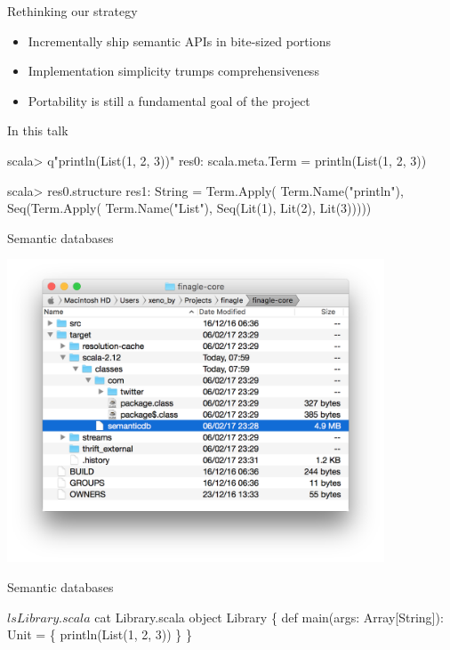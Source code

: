 \documentclass[svgnames,dvipsnames,hyperref={bookmarks=false},usepdftitle=false]{beamer}
\begin{document}
\begin{frame}{Rethinking our strategy}
\begin{itemize}
\item Incrementally ship semantic APIs in bite-sized portions
\item Implementation simplicity trumps comprehensiveness
\item Portability is still a fundamental goal of the project
\end{itemize}
\end{frame}

\begin{frame}[fragile]{In this talk}
\begin{semiverbatim}
scala> q"println(List(1, 2, 3))"
res0: scala.meta.Term = println(List(1, 2, 3))

scala> res0.structure
res1: String = Term.Apply(
  \alert{Term.Name("println")},
  Seq(Term.Apply(
    \alert{Term.Name("List")},
    Seq(Lit(1), Lit(2), Lit(3)))))
\end{semiverbatim}
\end{frame}


\begin{frame}{Semantic databases}
\begin{center}
\includegraphics[height=9cm]{semantic-db.png}
\end{center}
\end{frame}

\begin{frame}[fragile]{Semantic databases}
\begin{semiverbatim}
$ ls
Library.scala

$ cat Library.scala
object Library \{
  def main(args: Array[String]): Unit = \{
    println(List(1, 2, 3))
  \}
\}
\end{semiverbatim}
\end{frame}
\end{document}
